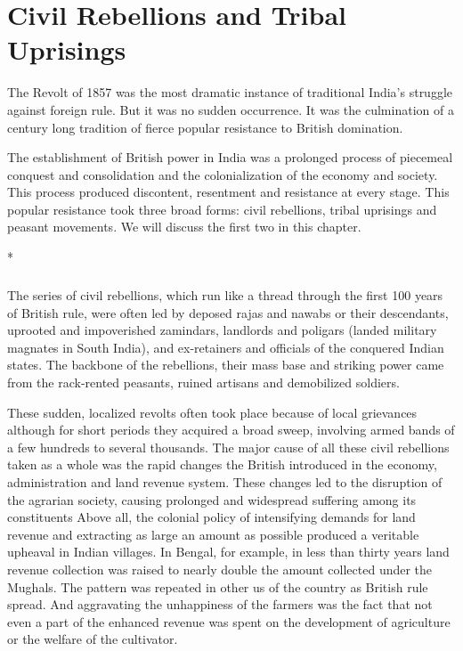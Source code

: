 \cleardoublepage
\chapter{Civil Rebellions and Tribal Uprisings}

The Revolt of 1857 was the most dramatic instance of traditional India's struggle against foreign rule. But it was no sudden occurrence. It was the culmination of a century long tradition of fierce popular resistance to British domination.

The establishment of British power in India was a prolonged process of piecemeal conquest and consolidation and the colonialization of the economy and society. This process produced discontent, resentment and resistance at every stage. This popular resistance took three broad forms: civil rebellions, tribal uprisings and peasant movements. We will discuss the first two in this chapter.

\begin{center}*\end{center}

\paragraph*{}
The series of civil rebellions, which run like a thread through the first 100 years of British rule, were often led by deposed rajas and nawabs or their descendants, uprooted and impoverished zamindars, landlords and poligars (landed military magnates in South India), and ex-retainers and officials of the conquered Indian states. The backbone of the rebellions, their mass base and striking power came from the rack-rented peasants, ruined artisans and demobilized soldiers.

These sudden, localized revolts often took place because of local grievances although for short periods they acquired a broad sweep, involving armed bands of a few hundreds to several thousands. The major cause of all these civil rebellions taken as a whole was the rapid changes the British introduced in the economy, administration and land revenue system. These changes led to the disruption of the agrarian society, causing prolonged and widespread suffering among its constituents Above all, the colonial policy of intensifying demands for land revenue and extracting as large an amount as possible produced a veritable upheaval in Indian villages. In Bengal, for example, in less than thirty years land revenue collection was raised to nearly double the amount collected under the Mughals. The pattern was repeated in other us of the country as British rule spread. And aggravating the unhappiness of the farmers was the fact that not even a part of the enhanced revenue was spent on the development of agriculture or the welfare of the cultivator.

